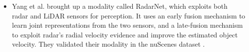 \documentclass[rnd]{mas_proposal}
\begin{document}
\begin{itemize}
      \item Yang et al. \cite{yang2020radarnet} brought up a modality called RadarNet, which exploits both radar and LiDAR sensors for perception. It uses an early fusion mechanism to learn joint representations from the two sensors, and a late-fusion mechanism to exploit radar’s radial velocity evidence and improve the estimated object velocity. They validated their modality in the nuScenes dataset \cite{caesar2020nuscenes}.


\end{itemize}
\end{document}
